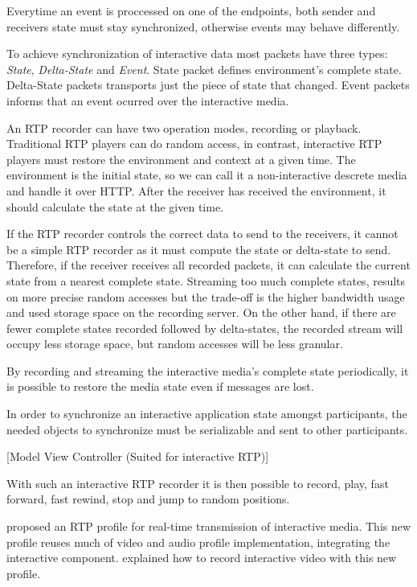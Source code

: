 	Everytime an event is proccessed on one of the endpoints, both sender and receivers state must stay synchronized, otherwise events may behave differently.

	To achieve synchronization of interactive data most packets have three types: \textit{State}, \textit{Delta-State} and \textit{Event}. State packet defines environment's complete state. Delta-State packets transports just the piece of state that changed. Event packets informs that an event ocurred over the interactive media. 

	An \ac{RTP} recorder can have two operation modes, recording or playback. Traditional \ac{RTP} players can do random access, in contrast, interactive \ac{RTP} players must restore the environment and context at a given time. The environment is the initial state, so we can call it a non-interactive descrete media and handle it over \ac{HTTP}. After the receiver has received the environment, it should calculate the state at the given time. 

	If the \ac{RTP} recorder controls the correct data to send to the receivers, it cannot be a simple \ac{RTP} recorder as it must compute the state or delta-state to send. Therefore, if the receiver receives all recorded packets, it can calculate the current state from a nearest complete state. Streaming too much complete states, results on more precise random accesses but the trade-off is the higher bandwidth usage and used storage space on the recording server. On the other hand, if there are fewer complete states recorded followed by delta-states, the recorded stream will occupy less storage space, but random accesses will be less granular.

	By recording and streaming the interactive media's complete state periodically, it is possible to restore the media state even if messages are lost.

	In order to synchronize an interactive application state amongst participants, the needed objects to synchronize must be serializable and sent to other participants.

  {\color{red}[Model View Controller (Suited for interactive RTP)]}

	With such an interactive \ac{RTP} recorder it is then possible to record, play, fast forward, fast rewind, stop and jump to random positions.

  \cite{interactive_stream} proposed an \ac{RTP} profile for real-time transmission of interactive media. This new profile reuses much of video and audio profile implementation, integrating the interactive component.   \cite{interactive_record} explained how to record interactive video with this new profile.

